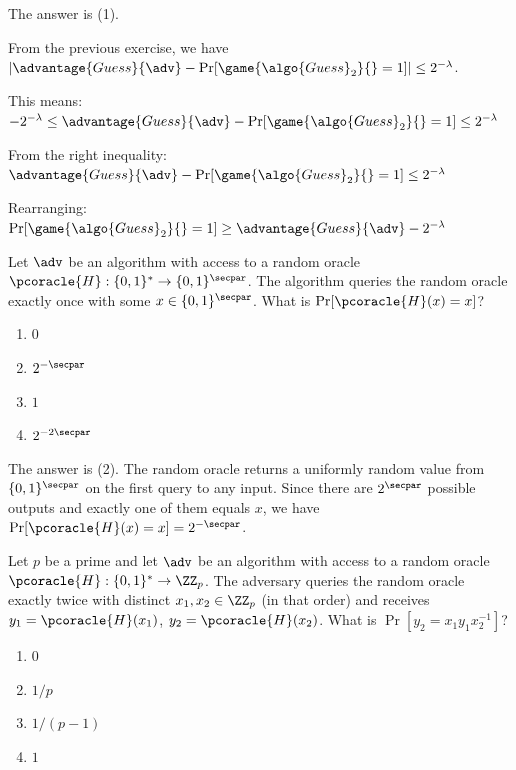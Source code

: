 \ifsolutions
\begin{mysolution}
  The answer is (1).
  
  From the previous exercise, we have $\left|\advantage{Guess}{\adv} - \Pr[\game{\algo{Guess}_2}{} = 1]\right| \leq 2^{-\lambda}$.
  
  This means:
  $-2^{-\lambda} \leq \advantage{Guess}{\adv} - \Pr[\game{\algo{Guess}_2}{} = 1] \leq 2^{-\lambda}$
  
  From the right inequality:
  $\advantage{Guess}{\adv} - \Pr[\game{\algo{Guess}_2}{} = 1] \leq 2^{-\lambda}$
  
  Rearranging:
  $\Pr[\game{\algo{Guess}_2}{} = 1] \geq \advantage{Guess}{\adv} - 2^{-\lambda}$
\end{mysolution}
\fi

\begin{exercise}
  Let $\adv$ be an algorithm with access to a random oracle $\pcoracle{H}: \{0,1\}^* \to \{0,1\}^\secpar$.
  The algorithm queries the random oracle exactly once with some $x \in \{0,1\}^\secpar$.
  What is $\Pr[\pcoracle{H}(x) = x]$?
  \begin{enumerate}
    \item $0$
    \item $2^{-\secpar}$
    \item $1$
    \item $2^{-2\secpar}$
  \end{enumerate}
\end{exercise}

\ifsolutions
\begin{mysolution}
  The answer is (2).
  The random oracle returns a uniformly random value from $\{0,1\}^\secpar$ on the first query to any input.
  Since there are $2^\secpar$ possible outputs and exactly one of them equals $x$, we have $\Pr[\pcoracle{H}(x) = x] = 2^{-\secpar}$.
\end{mysolution}
\fi

\begin{exercise}
  Let $p$ be a prime and let $\adv$ be an algorithm with access to a random oracle $\pcoracle{H}: \{0,1\}^* \to \ZZ_p$.
  The adversary queries the random oracle exactly twice with distinct $x_1, x_2 \in \ZZ_p$ (in that order) and receives $y_1 = \pcoracle{H}(x_1)$, $y_2 = \pcoracle{H}(x_2)$.
  What is $\Pr[y_2 = x_1 y_1 x_2^{-1}]$?
  \begin{enumerate}
    \item $0$
    \item $1/p$
    \item $1/(p-1)$
    \item $1$
  \end{enumerate}
\end{exercise}

